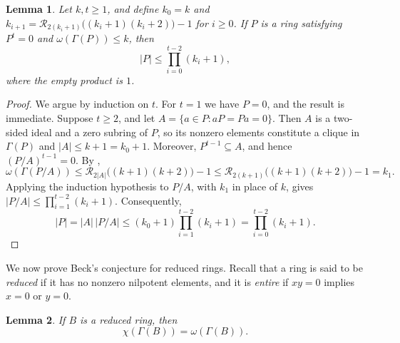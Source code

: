 \documentclass[a4paper,11pt]{amsart}
\newtheorem{lem}[lem]{Lemma}
\theoremstyle{definition}
\begin{document}
\begin{lem}\label{lem:nilpotent-order}
Let $k,t\ge1$, and define $k_0=k$ and
$k_{i+1}=\mathcal R_{2(k_i+1)}\bigl((k_i+1)(k_i+2)\bigr)-1$ for $i\ge0$.
If $P$ is a ring satisfying $P^t=0$ and $\omega(\Gamma(P))\le k$, then
\[
    |P|\le\prod_{i=0}^{t-2}(k_i+1),
\]
where the empty product is $1$.
\end{lem}

\begin{proof}
We argue by induction on $t$. For $t=1$ we have $P=0$, and the result is
immediate. Suppose $t\ge2$, and let
$A=\{a\in P:aP=Pa=0\}$. Then $A$ is a two-sided ideal and a zero subring of $P$, so its nonzero
elements constitute a clique in $\Gamma(P)$ and $|A|\le k+1=k_0+1$. Moreover,
$P^{t-1}\subseteq A$, and hence $(P/A)^{t-1}=0$. By
, 
\[
    \omega(\Gamma(P/A))
    \le
    \mathcal R_{2|A|}\bigl((k+1)(k+2)\bigr)-1
    \le
    \mathcal R_{2(k+1)}\bigl((k+1)(k+2)\bigr)-1
    =k_1.
\]
Applying the induction hypothesis to $P/A$, with $k_1$ in place of $k$,
gives $|P/A|\le\prod_{i=1}^{t-2}(k_i+1)$. Consequently,
\[
    |P|
    =|A|\,|P/A|
    \le
    (k_0+1)\prod_{i=1}^{t-2}(k_i+1)
    =
    \prod_{i=0}^{t-2}(k_i+1).
\]\end{proof}


We now prove Beck's conjecture for reduced rings. Recall that a ring is said to be \emph{reduced} if it has no nonzero nilpotent elements, and it is \emph{entire} if $xy=0$ implies $x=0$ or $y=0$.
\begin{lem}\label{lem:reduced-ring}
If $B$ is a reduced ring, then
\[
    \chi(\Gamma(B))=\omega(\Gamma(B)).
\]
\end{lem}
\end{document}
